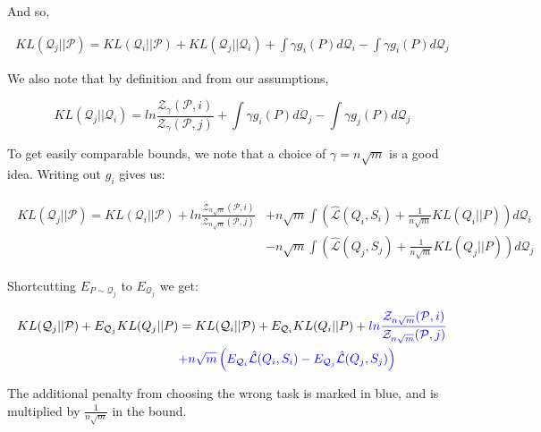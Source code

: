 \documentclass[letterpaper]{article}
\theoremstyle{definition}
\begin{document}
And so,

\begin{equation}
\begin{split}
KL(\mathcal{Q}_j||\mathcal{P}) = KL(\mathcal{Q}_i||\mathcal{P}) + KL(\mathcal{Q}_j||\mathcal{Q}_i) +  \int \gamma g_i(P) d\mathcal{Q}_i - \int \gamma g_i(P) d\mathcal{Q}_j
\end{split}
\end{equation}

We also note that by definition and from our assumptions, 

$$  KL(\mathcal{Q}_j||\mathcal{Q}_i) = ln\frac{\mathcal{Z}_{\gamma}(\mathcal{P}, i)}{\mathcal{Z}_{\gamma}(\mathcal{P}, j)} +  \int \gamma g_i(P) d\mathcal{Q}_j - \int \gamma g_j(P) d\mathcal{Q}_j$$

To get easily comparable bounds, we note that a choice of  $\gamma=n\sqrt{m}$ is a good idea. Writing out $g_i$ gives us:


\begin{align*}
\begin{split}
 KL(\mathcal{Q}_j||\mathcal{P}) = KL(\mathcal{Q}_i||\mathcal{P}) + ln\frac{\mathcal{Z}_{n\sqrt{m}}(\mathcal{P}, i)}{\mathcal{Z}_{n\sqrt{m}}(\mathcal{P}, j)} &+n\sqrt{m}  \int  \left (\hat{\mathcal{L}}(Q_i,S_i)+ \frac{1}{n\sqrt{m}}KL(Q_i||P)\right ) d\mathcal{Q}_i \\&- n\sqrt{m} \int \left (\hat{\mathcal{L}}(Q_j,S_j)+ \frac{1}{n\sqrt{m}}KL(Q_j||P)\right ) d\mathcal{Q}_j
\end{split}
\end{align*}

Shortcutting $E_{P\sim \mathcal{Q}_j}$ to $E_{\mathcal{Q}_j}$ we get:

\begin{align*}
\begin{split}
KL(\mathcal{Q}_j||\mathcal{P}) + E_{\mathcal{Q}_j} KL(Q_j||P) &= KL(\mathcal{Q}_i||\mathcal{P})  +  E_{\mathcal{Q}_i} KL(Q_i||P) + \textcolor{blue}{ln\frac{\mathcal{Z}_{n\sqrt{m}}(\mathcal{P}, i)}{\mathcal{Z}_{n\sqrt{m}}(\mathcal{P}, j)}} \\
&\textcolor{blue}{+n\sqrt{m} \left (E_{\mathcal{Q}_i} \hat{\mathcal{L}}(Q_i,S_i)
    - E_{\mathcal{Q}_j} \hat{\mathcal{L}}(Q_j,S_j) \right )   }
\end{split}
\end{align*}

The additional penalty from choosing the wrong task is marked in blue, and is multiplied by $\frac{1}{n\sqrt{m}}$ in the bound.
\end{document}
